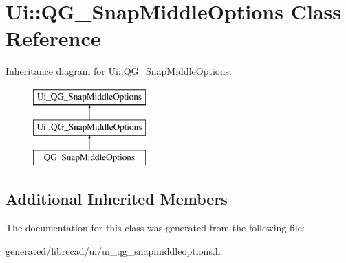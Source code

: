 \hypertarget{classUi_1_1QG__SnapMiddleOptions}{\section{Ui\-:\-:Q\-G\-\_\-\-Snap\-Middle\-Options Class Reference}
\label{classUi_1_1QG__SnapMiddleOptions}
}
Inheritance diagram for Ui\-:\-:Q\-G\-\_\-\-Snap\-Middle\-Options\-:\begin{figure}[H]
\begin{center}
\leavevmode
\includegraphics[height=3.000000cm]{classUi_1_1QG__SnapMiddleOptions}
\end{center}
\end{figure}
\subsection*{Additional Inherited Members}


The documentation for this class was generated from the following file\-:\begin{DoxyCompactItemize}
\item 
generated/librecad/ui/ui\-\_\-qg\-\_\-snapmiddleoptions.\-h\end{DoxyCompactItemize}
